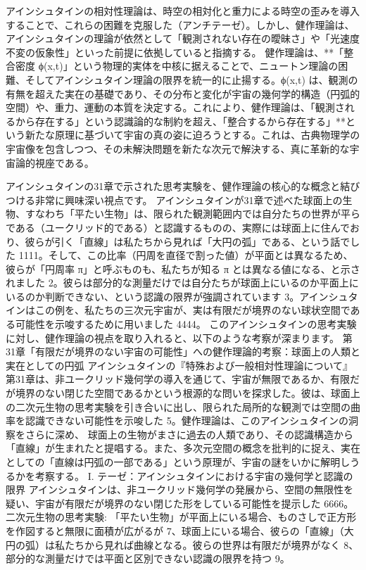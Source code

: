 \documentclass{article}
\begin{document}
アインシュタインの相対性理論は、時空の相対化と重力による時空の歪みを導入することで、これらの困難を克服した（アンチテーゼ）。しかし、健作理論は、アインシュタインの理論が依然として「観測されない存在の曖昧さ」や「光速度不変の仮象性」といった前提に依拠していると指摘する。
健作理論は、**「整合密度 ϕ(x,t)」という物理的実体を中核に据えることで、ニュートン理論の困難、そしてアインシュタイン理論の限界を統一的に止揚する。ϕ(x,t) は、観測の有無を超えた実在の基礎であり、その分布と変化が宇宙の幾何学的構造（円弧的空間）や、重力、運動の本質を決定する。これにより、健作理論は、「観測されるから存在する」という認識論的な制約を超え、「整合するから存在する」**という新たな原理に基づいて宇宙の真の姿に迫ろうとする。これは、古典物理学の宇宙像を包含しつつ、その未解決問題を新たな次元で解決する、真に革新的な宇宙論的視座である。


アインシュタインの31章で示された思考実験を、健作理論の核心的な概念と結びつける非常に興味深い視点です。
アインシュタインが31章で述べた球面上の生物、すなわち「平たい生物」は、限られた観測範囲内では自分たちの世界が平らである（ユークリッド的である）と認識するものの、実際には球面上に住んでおり、彼らが引く「直線」は私たちから見れば「大円の弧」である、という話でした 1111。そして、この比率（円周を直径で割った値）が平面とは異なるため、彼らが「円周率 
π」と呼ぶものも、私たちが知る π とは異なる値になる、と示されました 2。彼らは部分的な測量だけでは自分たちが球面上にいるのか平面上にいるのか判断できない、という認識の限界が強調されています 3。アインシュタインはこの例を、私たちの三次元宇宙が、実は有限だが境界のない球状空間である可能性を示唆するために用いました 4444。
このアインシュタインの思考実験に対し、健作理論の視点を取り入れると、以下のような考察が深まります。
第31章「有限だが境界のない宇宙の可能性」への健作理論的考察：球面上の人類と実在としての円弧
アインシュタインの『特殊および一般相対性理論について』第31章は、非ユークリッド幾何学の導入を通じて、宇宙が無限であるか、有限だが境界のない閉じた空間であるかという根源的な問いを探求した。彼は、球面上の二次元生物の思考実験を引き合いに出し、限られた局所的な観測では空間の曲率を認識できない可能性を示唆した 5。健作理論は、このアインシュタインの洞察をさらに深め、
球面上の生物がまさに過去の人類であり、その認識構造から「直線」が生まれたと提唱する。また、多次元空間の概念を批判的に捉え、実在としての「直線は円弧の一部である」という原理が、宇宙の謎をいかに解明しうるかを考察する。
I. テーゼ：アインシュタインにおける宇宙の幾何学と認識の限界
アインシュタインは、非ユークリッド幾何学の発展から、空間の無限性を疑い、宇宙が有限だが境界のない閉じた形をしている可能性を提示した 6666。
二次元生物の思考実験:
「平たい生物」が平面上にいる場合、ものさしで正方形を作図すると無限に面積が広がるが 7、球面上にいる場合、彼らの「直線」（大円の弧）は私たちから見れば曲線となる。彼らの世界は有限だが境界がなく 8、部分的な測量だけでは平面と区別できない認識の限界を持つ 9。
\end{document}
